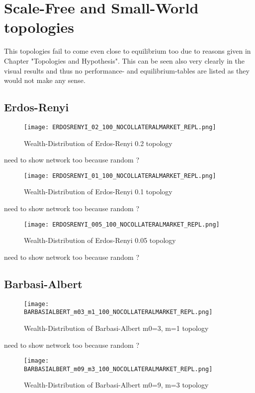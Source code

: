 \documentclass[Bachelorarbeit.tex]{subfiles}
\begin{document}
\section{Scale-Free and Small-World topologies}
This topologies fail to come even close to equilibrium too due to reasons given in Chapter "Topologies and Hypothesis". This can be seen also very clearly in the visual results and thus no performance- and equilibrium-tables are listed as they would not make any sense.

\subsection{Erdos-Renyi}
\begin{figure}[H]
	\centering
  \texttt{[image: ERDOSRENYI\_02\_100\_NOCOLLATERALMARKET\_REPL.png]}
	\caption{Wealth-Distribution of Erdos-Renyi 0.2 topology}
	\label{fig1}
\end{figure}

need to show network too because random ?

\begin{figure}[H]
	\centering
  \texttt{[image: ERDOSRENYI\_01\_100\_NOCOLLATERALMARKET\_REPL.png]}
	\caption{Wealth-Distribution of Erdos-Renyi 0.1 topology}
	\label{fig1}
\end{figure}

need to show network too because random ?

\begin{figure}[H]
	\centering
  \texttt{[image: ERDOSRENYI\_005\_100\_NOCOLLATERALMARKET\_REPL.png]}
	\caption{Wealth-Distribution of Erdos-Renyi 0.05 topology}
	\label{fig1}
\end{figure}

need to show network too because random ?

\subsection{Barbasi-Albert}
\begin{figure}[H]
	\centering
  \texttt{[image: BARBASIALBERT\_m03\_m1\_100\_NOCOLLATERALMARKET\_REPL.png]}
	\caption{Wealth-Distribution of Barbasi-Albert m0=3, m=1 topology}
	\label{fig1}
\end{figure}

need to show network too because random ?

\begin{figure}[H]
	\centering
  \texttt{[image: BARBASIALBERT\_m09\_m3\_100\_NOCOLLATERALMARKET\_REPL.png]}
	\caption{Wealth-Distribution of Barbasi-Albert m0=9, m=3 topology}
	\label{fig1}
\end{figure}
\end{document}
